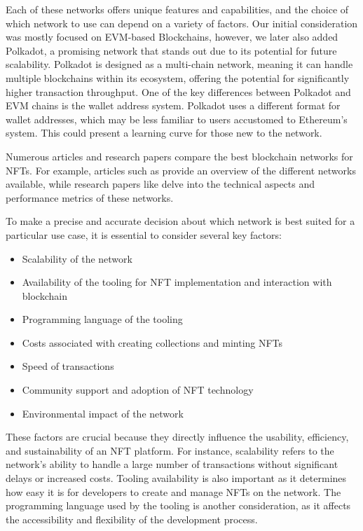 Each of these networks offers unique features and capabilities, and the choice of which network to use can depend on a variety of factors. Our initial consideration was mostly focused on EVM-based Blockchains, however, we later also added Polkadot, a promising network that stands out due to its potential for future scalability. Polkadot is designed as a multi-chain network, meaning it can handle multiple blockchains within its ecosystem, offering the potential for significantly higher transaction throughput. One of the key differences between Polkadot and EVM chains is the wallet address system. Polkadot uses a different format for wallet addresses, which may be less familiar to users accustomed to Ethereum’s system. This could present a learning curve for those new to the network.

Numerous articles and research papers compare the best blockchain networks for NFTs. For example, articles such as \cite{nfts} provide an overview of the different networks available, while research papers like \cite{fintech1030017} delve into the technical aspects and performance metrics of these networks.

To make a precise and accurate decision about which network is best suited for a particular use case, it is essential to consider several key factors:

\begin{itemize}
    \item Scalability of the network
    \item Availability of the tooling for NFT implementation and interaction with blockchain
    \item Programming language of the tooling
    \item Costs associated with creating collections and minting NFTs
    \item Speed of transactions
    \item Community support and adoption of NFT technology
    \item Environmental impact of the network
\end{itemize}

These factors are crucial because they directly influence the usability, efficiency, and sustainability of an NFT platform. For instance, scalability refers to the network's ability to handle a large number of transactions without significant delays or increased costs. Tooling availability is also important as it determines how easy it is for developers to create and manage NFTs on the network. The programming language used by the tooling is another consideration, as it affects the accessibility and flexibility of the development process.

